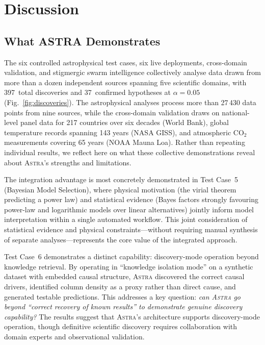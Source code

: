 \documentclass[usenatbib]{rasti}
\newcommand{\astra}{\textsc{Astra}\xspace}
\begin{document}
\section{Discussion}
\label{sec:discussion}

\subsection{What ASTRA Demonstrates}
\label{sec:discussion:demonstrates}

The six controlled astrophysical test cases, six live deployments, cross-domain validation, and stigmergic swarm intelligence collectively analyse data drawn from more than a dozen independent sources spanning five scientific domains, with 397~total discoveries and 37~confirmed hypotheses at $\alpha = 0.05$ (Fig.~\ref{fig:discoveries}).
The astrophysical analyses process more than 27\,430 data points from nine sources, while the cross-domain validation draws on national-level panel data for 217 countries over six decades (World Bank), global temperature records spanning 143 years (NASA GISS), and atmospheric CO$_{2}$ measurements covering 65 years (NOAA Mauna Loa).
Rather than repeating individual results, we reflect here on what these collective demonstrations reveal about \astra's strengths and limitations.

The integration advantage is most concretely demonstrated in Test Case~5 (Bayesian Model Selection), where physical motivation (the virial theorem predicting a power law) and statistical evidence (Bayes factors strongly favouring power-law and logarithmic models over linear alternatives) jointly inform model interpretation within a single automated workflow.
This joint consideration of statistical evidence and physical constraints---without requiring manual synthesis of separate analyses---represents the core value of the integrated approach.

Test Case~6 demonstrates a distinct capability: discovery-mode operation beyond knowledge retrieval.
By operating in ``knowledge isolation mode'' on a synthetic dataset with embedded causal structure, \astra discovered the correct causal drivers, identified column density as a proxy rather than direct cause, and generated testable predictions.
This addresses a key question: \emph{can \astra go beyond ``correct recovery of known results'' to demonstrate genuine discovery capability?}
The results suggest that \astra's architecture supports discovery-mode operation, though definitive scientific discovery requires collaboration with domain experts and observational validation.
\end{document}
